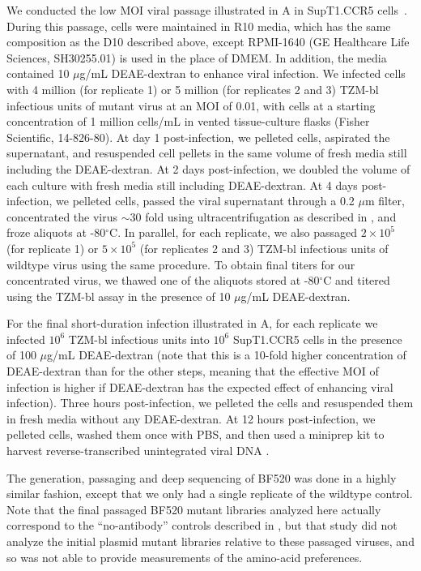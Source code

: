 \documentclass[9pt]{elife}
\begin{document}
We conducted the low MOI viral passage illustrated in A in SupT1.CCR5 cells~\citep[obtained from Dr. James Hoxie;][]{boyd2015mutations}.
During this passage, cells were maintained in R10 media, which has the same composition as the D10 described above, except RPMI-1640 (GE Healthcare Life Sciences, SH30255.01) is used in the place of DMEM.
In addition, the media contained 10 $\mu$g/mL DEAE-dextran to enhance viral infection.
We infected cells with 4 million (for replicate 1) or 5 million (for replicates 2 and 3) TZM-bl infectious units of mutant virus at an MOI of 0.01, with cells at a starting concentration of 1 million cells/mL in vented tissue-culture flasks (Fisher Scientific, 14-826-80).
At day 1 post-infection, we pelleted cells, aspirated the supernatant, and resuspended cell pellets in the same volume of fresh media still including the DEAE-dextran.
At 2 days post-infection, we doubled the volume of each culture with fresh media still including DEAE-dextran.
At 4 days post-infection, we pelleted cells, passed the viral supernatant through a 0.2 $\mu$m filter, concentrated the virus $\sim$30 fold using ultracentrifugation as described in \citet{dingens2017comprehensive}, and froze aliquots at -80$^{\circ}$C.
In parallel, for each replicate, we also passaged $2\times 10^5$ (for replicate 1) or $5 \times 10^5$ (for replicates 2 and 3) TZM-bl infectious units of wildtype virus using the same procedure.
To obtain final titers for our concentrated virus, we thawed one of the aliquots stored at -80$^{\circ}$C and titered using the TZM-bl assay in the presence of 10 $\mu$g/mL DEAE-dextran.

For the final short-duration infection illustrated in A, for each replicate we infected $10^6$ TZM-bl infectious units into $10^6$ SupT1.CCR5 cells in the presence of 100 $\mu$g/mL DEAE-dextran (note that this is a 10-fold higher concentration of DEAE-dextran than for the other steps, meaning that the effective MOI of infection is higher if DEAE-dextran has the expected effect of enhancing viral infection).
Three hours post-infection, we pelleted the cells and resuspended them in fresh media without any DEAE-dextran.
At 12 hours post-infection, we pelleted cells, washed them once with PBS, and then used a miniprep kit to harvest reverse-transcribed unintegrated viral DNA \citep{haddox2016experimental}.

The generation, passaging and deep sequencing of BF520 was done in a highly similar fashion, except that we only had a single replicate of the wildtype control.
Note that the final passaged BF520 mutant libraries analyzed here actually correspond to the ``no-antibody'' controls described in \citet{dingens2017comprehensive}, but that study did not analyze the initial plasmid mutant libraries relative to these passaged viruses, and so was not able to provide measurements of the amino-acid preferences.
\end{document}

